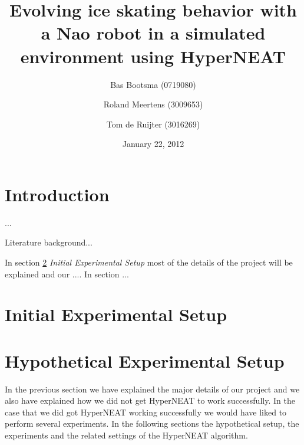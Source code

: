 \documentclass[a4paper,10pt]{article}
\begin{document}
\title{Evolving ice skating behavior with a Nao robot in a simulated environment using HyperNEAT}

\author{Bas Bootsma (0719080) \and Roland Meertens (3009653) \and Tom de Ruijter (3016269)}

\date{January 22, 2012}

\maketitle

\section{Introduction}
...

Literature background...

In section \ref{sec:initial-experimental-setup} \emph{Initial Experimental Setup} most of the details of the project will be explained and our .... In section ...

\section{Initial Experimental Setup}
\label{sec:initial-experimental-setup}

\section{Hypothetical Experimental Setup}
\label{sec:hypothetical-experimental-setup}
In the previous section we have explained the major details of our project and we also have explained how we did not get HyperNEAT to work successfully. In the case that we did got HyperNEAT working successfully we would have liked to perform several experiments. In the following sections the hypothetical setup, the experiments and the related settings of the HyperNEAT algorithm.
\end{document}
